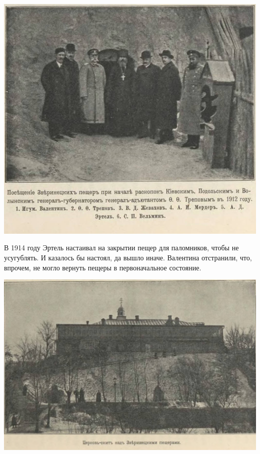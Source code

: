 \begin{center}
\includegraphics[width=\linewidth]{chast-colebanie-osnov/nachalo/zverp-06.jpg}
\end{center}

В 1914 году Эртель настаивал на закрытии пещер для паломников, чтобы не усугублять. И казалось бы настоял, да вышло иначе. Валентина отстранили, что, впрочем, не могло вернуть пещеры в первоначальное состояние. 

\newpage
\vspace*{\fill}
\begin{center}
\includegraphics[width=\linewidth]{chast-colebanie-osnov/nachalo/zverp-01.jpg}
\end{center}

